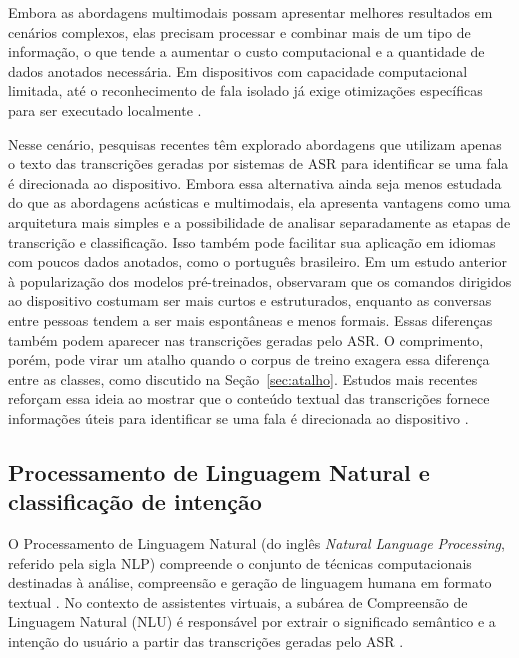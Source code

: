\documentclass[
    12pt,                %
    openright,           %
    oneside,             %
    a4paper,             %
    english,             %
    brazil               %
]{abntex2}
\begin{document}
Embora as abordagens multimodais possam apresentar melhores resultados em cenários complexos, elas precisam processar e combinar mais de um tipo de informação, o que tende a aumentar o custo computacional e a quantidade de dados anotados necessária. Em dispositivos com capacidade computacional limitada, até o reconhecimento de fala isolado já exige otimizações específicas para ser executado localmente \cite{Xu2024}.

Nesse cenário, pesquisas recentes têm explorado abordagens que utilizam apenas o texto das transcrições geradas por sistemas de ASR para identificar se uma fala é direcionada ao dispositivo. Embora essa alternativa ainda seja menos estudada do que as abordagens acústicas e multimodais, ela apresenta vantagens como uma arquitetura mais simples e a possibilidade de analisar separadamente as etapas de transcrição e classificação. Isso também pode facilitar sua aplicação em idiomas com poucos dados anotados, como o português brasileiro. Em um estudo anterior à popularização dos modelos pré-treinados,  observaram que os comandos dirigidos ao dispositivo costumam ser mais curtos e estruturados, enquanto as conversas entre pessoas tendem a ser mais espontâneas e menos formais. Essas diferenças também podem aparecer nas transcrições geradas pelo ASR. O comprimento, porém, pode virar um atalho quando o corpus de treino exagera essa diferença entre as classes, como discutido na Seção~\ref{sec:atalho}. Estudos mais recentes reforçam essa ideia ao mostrar que o conteúdo textual das transcrições fornece informações úteis para identificar se uma fala é direcionada ao dispositivo \cite{Wagner2024, Dighe2024}.


\subsection{Processamento de Linguagem Natural e classificação de intenção}

O Processamento de Linguagem Natural (do inglês \textit{Natural Language Processing}, referido pela sigla NLP) compreende o conjunto de técnicas computacionais destinadas à análise, compreensão e geração de linguagem humana em formato textual \cite{Jurafsky2026}. No contexto de assistentes virtuais, a subárea de Compreensão de Linguagem Natural (NLU) é responsável por extrair o significado semântico e a intenção do usuário a partir das transcrições geradas pelo ASR \cite{Weld2023}.
\end{document}
